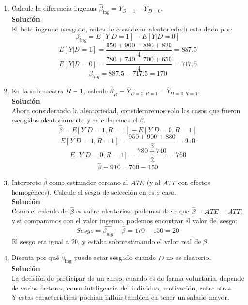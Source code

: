 \documentclass[10pt,a4paper]{article}
\begin{document}
\begin{enumerate}
\begin{enumerate}
\item Calcule la diferencia ingenua $\hat\beta_{\text{ing}}=\overline{Y}_{D=1}-\overline{Y}_{D=0}$.
\\
\textbf{Solución}
\\
El beta ingenuo (sesgado, antes de considerar aleatoriedad) esta dado por:
$$\beta_{ing}=E[Y|D=1]-E[Y|D=0]$$
$$E[Y|D=1] = \frac{950+900+880+820}{4}=887.5$$
$$E[Y|D=0]=\frac{780+740+700+650}{4}=717.5$$
$$\beta_{ing}=887.5-717.5=170$$

\item En la submuestra $R=1$, calcule $\hat\beta_{R} = \overline{Y}_{D=1,R=1}-\overline{Y}_{D=0,R=1}$.
\\
\textbf{Solución}
\\
Ahora considerando la aleatoriedad, consideraremos solo los casos que fueron escogidos aleatoriamente y calcularemos el $\beta$.
$$\hat\beta = E[{Y}|{D=1,R=1}]-E[{Y}|{D=0,R=1}]$$
$$ E[{Y}|{D=1,R=1}] = \frac{950+900+880}{3}=910$$
$$ E[{Y}|{D=0,R=1}] = \frac{780+740}{2}=760$$
$$\hat{\beta}= 910-760=150$$
\item Interprete $\hat\beta$ como estimador cercano al $ATE$ (y al $ATT$ con efectos homogéneos). Calcule el sesgo de selección en este caso.
\\
\textbf{Solución}
\\
Como el calculo de $\hat{\beta}$ es sobre aleatorios, podemos decir que $\hat{\beta}=ATE=ATT$, y si comparamos con el valor ingenuo, podemos encontrar el valor del sesgo:
$$Sesgo=\hat{\beta_{ing}}-\hat{\beta}=170-150=20$$
El sesgo era igual a 20, y estaba sobreestimando el valor real de $\beta$.
\item Discuta por qué $\hat\beta_{\text{ing}}$ puede estar sesgado cuando $D$ no es aleatorio.
\\
\textbf{Solución}
\\
La decisión de participar de un curso, cuando es de forma voluntaria, depende de varios factores, como inteligencia del individuo, motivación, entre otros... Y estas características podrían influir tambien en tener un salario mayor.
\end{enumerate}


\end{enumerate}
\end{document}
